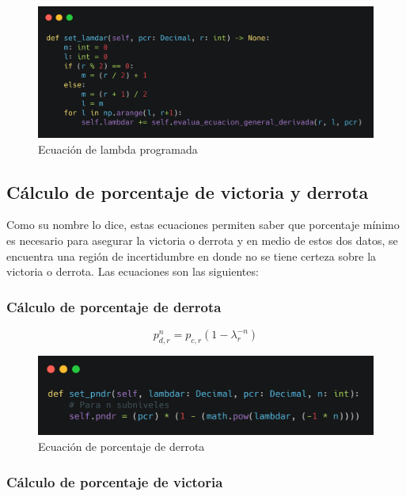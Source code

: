 \begin{figure}[!htb]
    \centering
    \includegraphics[scale=.15]{TT/img/pruebas/lambda.png}
    \caption{Ecuación de lambda programada}
    \label{graphic:lambda}
\end{figure}

\subsection{Cálculo de porcentaje de victoria y derrota}
Como su nombre lo dice, estas ecuaciones permiten saber que porcentaje mínimo es necesario para asegurar la victoria o derrota y en medio de estos dos datos, se encuentra una región de incertidumbre en donde no se tiene certeza sobre la victoria o derrota. Las ecuaciones son las siguientes:

\subsubsection{Cálculo de porcentaje de derrota}

\begin{equation}
    p_{d,r}^n = p_{c,r}(1-\lambda_r^{-n})
\end{equation}

\begin{figure}[!htb]
    \centering
    \includegraphics[scale=.15]{TT/img/pruebas/pndr.png}
    \caption{Ecuación de porcentaje de derrota}
    \label{graphic:pndr}
\end{figure}

\subsubsection{Cálculo de porcentaje de victoria}

